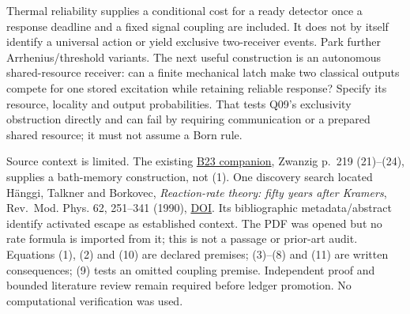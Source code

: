 \documentclass[11pt,a4paper]{article}
\begin{document}
Thermal reliability supplies a conditional cost for a ready detector
once a response deadline and a fixed signal coupling are included. It
does not by itself identify a universal action or yield exclusive
two-receiver events. Park further Arrhenius/threshold variants. The next
useful construction is an autonomous shared-resource receiver: can a
finite mechanical latch make two classical outputs compete for one
stored excitation while retaining reliable response? Specify its
resource, locality and output probabilities. That tests Q09's
exclusivity obstruction directly and can fail by requiring communication
or a prepared shared resource; it must not assume a Born rule.

Source context is limited. The existing
\href{../docs/batches/B23/harmonic-receiver-source-companion.md}{B23
companion}, Zwanzig p.~219 (21)--(24), supplies a bath-memory
construction, not (1). One discovery search located Hänggi, Talkner and
Borkovec, \emph{Reaction-rate theory: fifty years after Kramers},
Rev.~Mod. Phys. 62, 251--341 (1990),
\href{https://doi.org/10.1103/RevModPhys.62.251}{DOI}. Its bibliographic
metadata/abstract identify activated escape as established context. The
PDF was opened but no rate formula is imported from it; this is not a
passage or prior-art audit. Equations (1), (2) and (10) are declared
premises; (3)--(8) and (11) are written consequences; (9) tests an
omitted coupling premise. Independent proof and bounded literature
review remain required before ledger promotion. No computational
verification was used.
\end{document}
